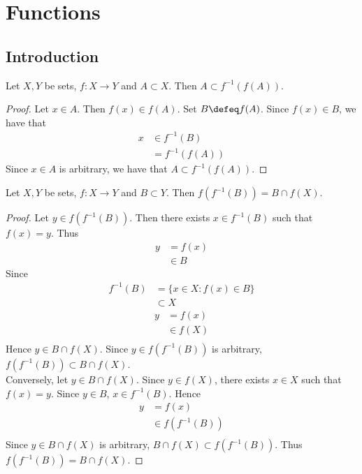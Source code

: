 \documentclass{book}
\begin{document}
	
	
	
	
	
	
	
	
	
	
	\section{Functions}
	
	
	\subsection{Introduction}
	
	\begin{ex} 
		Let $X, Y$ be sets, $f:X \rightarrow Y$ and $A \subset X$. Then $A \subset f^{-1}(f(A))$.
	\end{ex}

	\begin{proof}
		Let $x \in A$. Then $f(x) \in f(A)$. Set $B \defeq f(A)$. Since $f(x) \in B$, we have that 
		\begin{align*}
			x 
			& \in f^{-1}(B) \\
			& = f^{-1}(f(A))
		\end{align*}
		Since $x \in A$ is arbitrary, we have that $A \subset f^{-1}(f(A))$. 
	\end{proof}
	
	\begin{ex} 
		Let $X, Y$ be sets, $f:X \rightarrow Y$ and $B \subset Y$. Then $f(f^{-1}(B)) = B \cap f(X)$. 
	\end{ex}

	\begin{proof}
		Let $y \in f(f^{-1}(B))$. Then there exists $x \in f^{-1}(B)$ such that $f(x) = y$. Thus 
		\begin{align*}
			y
			& = f(x) \\
			& \in B
		\end{align*}
		Since 
		\begin{align*}
			f^{-1}(B) 
			& = \{x \in X: f(x) \in B\} \\
			& \subset X
		\end{align*}
		\begin{align*}
			y
			& = f(x) \\
			& \in f(X) \\
		\end{align*}
			Hence $y \in B \cap f(X)$. Since $y \in f(f^{-1}(B))$ is arbitrary, $f(f^{-1}(B)) \subset  B \cap f(X)$.\\
			Conversely, let $y \in B \cap f(X)$. Since $y \in f(X)$, there exists $x \in X$ such that $f(x) = y$. Since $y \in B$, $x \in f^{-1}(B)$. Hence 
			\begin{align*}
				y
				& = f(x) \\
				& \in f(f^{-1}(B)) \\
			\end{align*}
			Since $y \in B \cap f(X)$ is arbitrary, $B \cap f(X) \subset f(f^{-1}(B))$. Thus $f(f^{-1}(B)) =  B \cap f(X)$.
		\end{proof}
	
\end{document}
